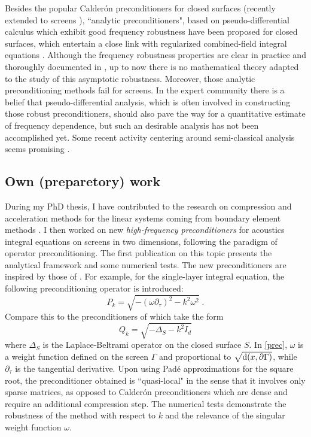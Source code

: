 \documentclass[]{report}
\begin{document}
Besides the popular Calder\'{o}n preconditioners
\cite{christiansen2000preconditionneurs,christiansen2002preconditioner} for closed
surfaces (recently extended to screens \cite{bruno2012second}), ``analytic
preconditioners", based on pseudo-differential calculus which exhibit good frequency
robustness \cite{antoine2007generalized} have been proposed for closed surfaces, which
entertain a close link with regularized combined-field integral equations
\cite{buffa2005regularized}. Although the frequency robustness properties are clear in
practice and thoroughly documented in \cite{boubendir2014well}, up to now there is no
mathematical theory adapted to the study of this asymptotic robustness. Moreover, those
analytic preconditioning methods fail for screens. In the expert community there is a
belief that pseudo-differential analysis, which is often involved in constructing those
robust preconditioners, should also pave the way for a quantitative estimate of frequency
dependence, but such an desirable analysis has not been accomplished yet. Some recent
activity centering around semi-classical analysis seems promising
\cite{galkowski2019wavenumber}.

\subsection{Own (preparetory) work}

During my PhD thesis, I have contributed to the research on compression and acceleration
methods for the linear systems coming from boundary element methods
\cite{averseng2017fast}. I then worked on new \emph{high-frequency preconditioners} for acoustics
integral equations on screens in two dimensions, following the paradigm of operator
preconditioning. The first publication on this topic \cite{alouges2019new} presents the
analytical framework and some numerical tests. The new preconditioners are inspired by those of
\cite{antoine2007generalized}. For example, for the single-layer integral equation, the
following preconditioning operator is introduced:
\begin{equation}
\label{prec}
P_k = \sqrt{-(\omega \partial_\tau)^2 - k^2 \omega^2}\;.
\end{equation}
Compare this to the preconditioners of \cite{antoine2007generalized} which take the
form \[Q_k = \sqrt{-\Delta_S - k^2 I_d}\] where $\Delta_S$ is the Laplace-Beltrami
operator on the closed surface $S$.  In \eqref{prec}, $\omega$ is a weight function
defined on the screen $\Gamma$ and proportional to $\sqrt{\textup{d}(x,\partial \Gamma)}$,
while $\partial_\tau$ is the tangential derivative.  Upon using Padé approximations for
the square root, the preconditioner obtained is ``quasi-local" in the sense that it
involves only sparse matrices, as opposed to Calder\'{o}n preconditioners which are dense
and require an additional compression step. The numerical tests demonstrate the robustness
of the method with respect to $k$ and the relevance of the singular weight function
$\omega$.
\end{document}
